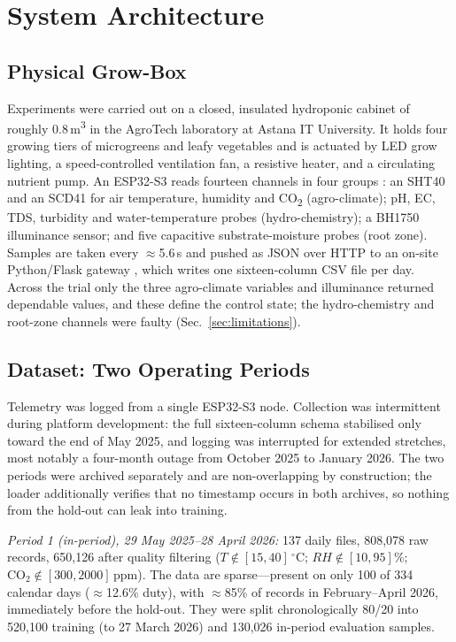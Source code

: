 \documentclass[conference]{IEEEtran}
\begin{document}
\section{System Architecture}

\subsection{Physical Grow-Box}
Experiments were carried out on a closed, insulated hydroponic cabinet of roughly
0.8\,m\textsuperscript{3} in the AgroTech laboratory at Astana IT University. It
holds four growing tiers of microgreens and leafy vegetables and is actuated by
LED grow lighting, a speed-controlled ventilation fan, a resistive heater, and a
circulating nutrient pump. An ESP32-S3 reads fourteen channels in four groups
\cite{bakirov2025}: an SHT40 and an SCD41 for air temperature, humidity and
CO\textsubscript{2} (agro-climate); pH, EC, TDS, turbidity and water-temperature
probes (hydro-chemistry); a BH1750 illuminance sensor; and five capacitive
substrate-moisture probes (root zone). Samples are taken every $\approx$5.6\,s
and pushed as JSON over HTTP to an on-site Python/Flask gateway
\cite{akhmetzhanov2024,yedilkhan2025}, which writes one sixteen-column CSV file
per day. Across the trial only the three agro-climate variables and illuminance
returned dependable values, and these define the control state; the
hydro-chemistry and root-zone channels were faulty (Sec.~\ref{sec:limitations}).

\subsection{Dataset: Two Operating Periods}
Telemetry was logged from a single ESP32-S3 node. Collection was intermittent
during platform development: the full sixteen-column schema stabilised only
toward the end of May 2025, and logging was interrupted for extended stretches,
most notably a four-month outage from October 2025 to January 2026. The two
periods were archived separately and are non-overlapping by construction; the
loader additionally verifies that no timestamp occurs in both archives, so
nothing from the hold-out can leak into training.

\emph{Period 1 (in-period), 29 May 2025--28 April 2026:} 137 daily files,
808{,}078 raw records, 650{,}126 after quality filtering ($T \notin
[15,40]\,^{\circ}$C; $\mathit{RH} \notin [10,95]\%$; $\mathrm{CO_2} \notin
[300,2000]$\,ppm). The data are sparse---present on only 100 of 334 calendar days
($\approx$12.6\% duty), with $\approx$85\% of records in February--April 2026,
immediately before the hold-out. They were split chronologically 80/20 into
520{,}100 training (to 27 March 2026) and 130{,}026 in-period evaluation samples.
\end{document}
